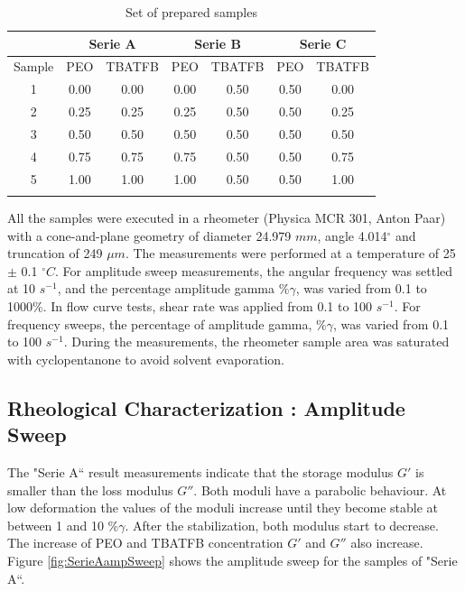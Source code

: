 \begin{table}[th]
\caption{Set of prepared samples \cite{Flores2017}}
\begin{center}
\begin{tabular}{ c c c c c c c } 
\hline
\text{} & \multicolumn{2}{c}{Serie A} & \multicolumn{2}{c}{Serie B} & \multicolumn{2}{c}{Serie C} \\
\hline
Sample & PEO & TBATFB & PEO & TBATFB & PEO & TBATFB \\
\hline
1 & 0.00 & 0.00 & 0.00 & 0.50 & 0.50 & 0.00 \\
2 & 0.25 & 0.25 & 0.25 & 0.50 & 0.50 & 0.25 \\
3 & 0.50 & 0.50 & 0.50 & 0.50 & 0.50 & 0.50 \\
4 & 0.75 & 0.75 & 0.75 & 0.50 & 0.50 & 0.75 \\
5 & 1.00 & 1.00 & 1.00 & 0.50 & 0.50 & 1.00 \\
\hline
\label{tbl:FloresSamples}
\end{tabular}
\end{center}
\end{table}

All the samples were executed in a rheometer (Physica MCR 301, Anton Paar) with a cone-and-plane geometry of diameter 24.979 $m m$, angle 4.014$^\circ$ and truncation of 249 $\mu m$. The measurements were performed at a temperature of 25 $\pm$ 0.1 $^\circ C$. For amplitude sweep measurements, the angular frequency was settled at 10 $s^{-1}$, and the percentage amplitude gamma $\% \gamma$, was varied from 0.1 to 1000\%. In flow curve tests, shear rate was applied from 0.1 to 100 $s^{-1}$. For frequency sweeps, the percentage of amplitude gamma, $\% \gamma$, was varied from 0.1 to 100 $s^{-1}$. During the measurements, the rheometer sample area was saturated with cyclopentanone to avoid solvent evaporation.

\subsection{Rheological Characterization : \textbf{Amplitude Sweep}}
The "Serie A`` result measurements indicate that the storage modulus $G'$ is smaller than the loss modulus $G''$. Both moduli have a parabolic behaviour. At low deformation the values of the moduli increase until they become stable at between 1 and 10 $\% \gamma$. After the stabilization, both modulus start to decrease. The increase of PEO and TBATFB concentration $G'$ and $G''$ also increase. Figure \ref{fig:SerieAampSweep} shows the amplitude sweep for the samples of "Serie A``.

